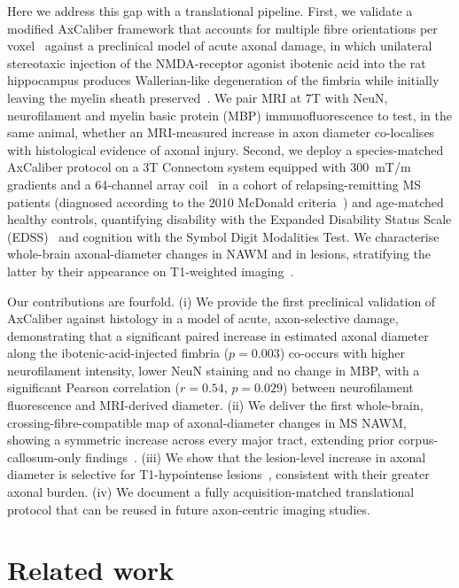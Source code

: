 \documentclass[11pt]{article}
\begin{document}
Here we address this gap with a translational pipeline. First, we validate a modified AxCaliber framework that accounts for multiple fibre orientations per voxel~\cite{desantis2019whole,tax2014recursive} against a preclinical model of acute axonal damage, in which unilateral stereotaxic injection of the NMDA-receptor agonist ibotenic acid into the rat hippocampus produces Wallerian-like degeneration of the fimbria while initially leaving the myelin sheath preserved~\cite{conforti2014wallerian,adalbert2012intra}. We pair MRI at 7T with NeuN, neurofilament and myelin basic protein (MBP) immunofluorescence to test, in the same animal, whether an MRI-measured increase in axon diameter co-localises with histological evidence of axonal injury. Second, we deploy a species-matched AxCaliber protocol on a 3T Connectom system equipped with \SI{300}{mT/m} gradients and a 64-channel array coil~\cite{jones2018microstructural} in a cohort of relapsing-remitting MS patients (diagnosed according to the 2010 McDonald criteria~\cite{polman2011diagnostic}) and age-matched healthy controls, quantifying disability with the Expanded Disability Status Scale (EDSS)~\cite{kurtzke1983rating} and cognition with the Symbol Digit Modalities Test. We characterise whole-brain axonal-diameter changes in NAWM and in lesions, stratifying the latter by their appearance on T1-weighted imaging~\cite{vanwaesberghe1999axonal}.

Our contributions are fourfold. (i) We provide the first preclinical validation of AxCaliber against histology in a model of acute, axon-selective damage, demonstrating that a significant paired increase in estimated axonal diameter along the ibotenic-acid-injected fimbria ($p=0.003$) co-occurs with higher neurofilament intensity, lower NeuN staining and no change in MBP, with a significant Pearson correlation ($r=0.54$, $p=0.029$) between neurofilament fluorescence and MRI-derived diameter. (ii) We deliver the first whole-brain, crossing-fibre-compatible map of axonal-diameter changes in MS NAWM, showing a symmetric increase across every major tract, extending prior corpus-callosum-only findings~\cite{desantis2019whole,ercan2015multimodal}. (iii) We show that the lesion-level increase in axonal diameter is selective for T1-hypointense lesions~\cite{vanwaesberghe1999axonal}, consistent with their greater axonal burden. (iv) We document a fully acquisition-matched translational protocol that can be reused in future axon-centric imaging studies.

\section{Related work}
\end{document}
